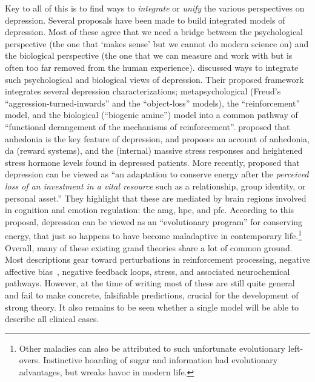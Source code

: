 Key to all of this is to find ways to \emph{integrate} or \emph{unify} the various perspectives on depression.
Several proposals have been made to build integrated models of depression.
Most of these agree that we need a bridge between the psychological perspective (the one that `makes sense' but we cannot do modern science on) and the biological perspective (the one that we can measure and work with but is often too far removed from the human experience).
\textcite{Akiskal1973} discussed ways to integrate such psychological and biological views of depression.
Their proposed framework integrates several depression characterizations; metapsychological (Freud's ``aggression-turned-inwards'' and the ``object-loss'' models), the ``reinforcement'' model, and the biological (``biogenic amine'') model into a common pathway of ``functional derangement of the mechanisms of reinforcement''.
\textcite{Pizzagalli2014} proposed that anhedonia is the key feature of depression, and proposes an account of anhedonia, \gls{da} (reward systems), and the (internal) massive stress responses and heightened stress hormone levels found in depressed patients.
More recently, \textcite{Beck2016} proposed that depression can be viewed as ``an adaptation to conserve energy after the \emph{perceived loss of an investment in a vital resource} such as a relationship, group identity, or personal asset.''
They highlight that these are mediated by brain regions involved in cognition and emotion regulation: the \gls{amg}, \gls{hpc}, and \gls{pfc}.
According to this proposal, depression can be viewed as an ``evolutionary program'' for conserving energy, that just so happens to have become maladaptive in contemporary life.\footnote{Other maladies can also be attributed to such unfortunate evolutionary left-overs. Instinctive hoarding of sugar and information had evolutionary advantages, but wreaks havoc in modern life.}
Overall, many of these existing grand theories share a lot of common ground.
Most descriptions gear toward perturbations in reinforcement processing, negative affective bias~\parencite{Pulcu2017}, negative feedback loops, stress, and associated neurochemical pathways.
However, at the time of writing most of these are still quite general and fail to make concrete, falsifiable predictions, crucial for the development of strong theory.
It also remains to be seen whether a single model will be able to describe all clinical cases.

